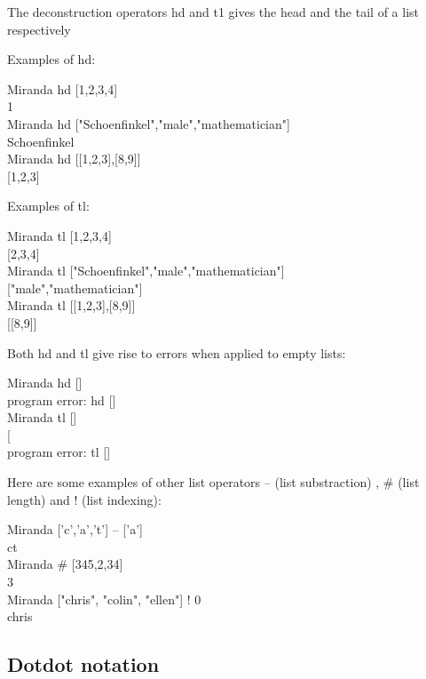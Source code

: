 \documentclass[11pt]{article}
\begin{document}
The deconstruction operators hd and t1 gives the head and the tail of a list respectively

Examples of hd:
\begin{tcolorbox}
Miranda hd [1,2,3,4]\\
1\\
Miranda hd {["Schoenfinkel","male","mathematician"]}\\
Schoenfinkel\\
Miranda hd [[1,2,3],[8,9]]\\
{[1,2,3]}
\end{tcolorbox}

Examples of tl:

\begin{tcolorbox}
Miranda tl [1,2,3,4]\\
{[2,3,4]} \\
Miranda tl {["Schoenfinkel","male","mathematician"]}\\
{["male","mathematician"]}\\
Miranda tl [[1,2,3],[8,9]]\\
{[[8,9]]}
\end{tcolorbox}

Both hd and tl give rise to errors when applied to empty lists:

\begin{tcolorbox}
Miranda hd {[]} \\
program error: hd []\\
Miranda tl []\\
{[}\\
program error: tl {[]}\\ 
\end{tcolorbox}

Here are some examples of other list operators -- (list substraction) , \# (list length) and ! (list indexing):

\begin{tcolorbox}
Miranda [’c’,’a’,’t’] -- {[’a’]}\\
ct\\
Miranda \# [345,2,34]\\
3\\
Miranda ["chris", "colin", "ellen"] ! 0\\
chris
\end{tcolorbox}

\subsection{Dotdot notation}
\end{document}
